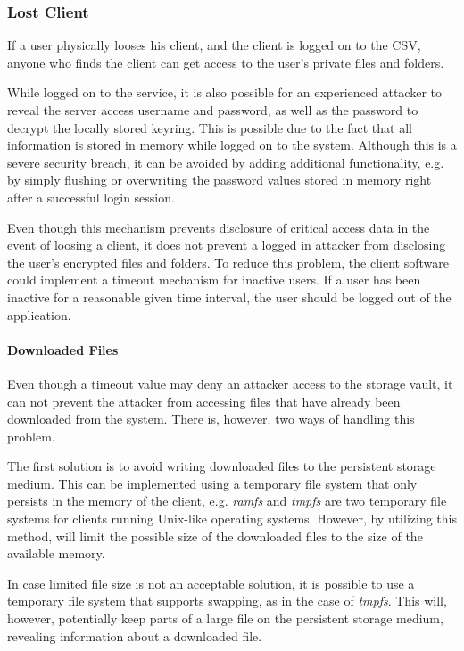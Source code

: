 \documentclass[pdftex,english,10pt,b5paper,twoside]{book}
\begin{document}
\subsubsection{Lost Client}

If a user physically looses his client, and the client is logged on to the
\acl{CSV}, anyone who finds the client can get access to the user's
private files and folders. 

While logged on to the service, it is also possible for an experienced attacker
to reveal the server access username and password, as well as the password to
decrypt the locally stored keyring. This is possible due to the fact that all
information is stored in memory while logged on to the system. Although this is
a severe security breach, it can be avoided by adding additional functionality,
e.g. by simply flushing or overwriting the password values stored in memory
right after a successful login session.

Even though this mechanism prevents disclosure of critical access data in the
event of loosing a client, it does not prevent a logged in attacker from
disclosing the user's encrypted files and folders. To reduce this problem, the
client software could implement a timeout mechanism for inactive users. If a
user has been inactive for a reasonable given time interval, the user should be
logged out of the application. 

\paragraph{Downloaded Files} Even though a timeout value may deny an attacker
access to the storage vault, it can not prevent the attacker from accessing
files that have already been downloaded from the system. There is, however, two
ways of handling this problem.

The first solution is to avoid writing downloaded files to the persistent
storage medium. This can be implemented using a temporary file system that only
persists in the memory of the client, e.g. \emph{ramfs} and \emph{tmpfs} are
two temporary file systems for clients running Unix-like operating systems.
However, by utilizing this method, will limit the possible size of the
downloaded files to the size of the available memory. 

In case limited file size is not an acceptable solution, it is possible to use
a temporary file system that supports swapping, as in the case of \emph{tmpfs}.
This will, however, potentially keep parts of a large file on the persistent
storage medium, revealing information about a downloaded file.
\end{document}
